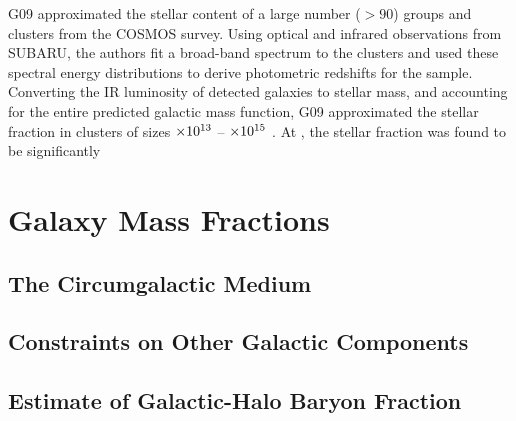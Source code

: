 G09 approximated the stellar content of a large number ($>90$) groups
and clusters from the COSMOS survey. Using optical and infrared
observations from SUBARU, the authors fit a broad-band spectrum to the
clusters and used these spectral energy distributions to derive photometric redshifts for
the sample. Converting the IR luminosity of detected galaxies to
stellar mass, and accounting for the entire predicted galactic mass
function, G09 approximated the stellar fraction in clusters of sizes
$\times 10^{13}$ -- $\times 10^{15}$ \Msun. At \rfive{}, the stellar fraction
was found to be significantly 

\section{Galaxy Mass Fractions}
\label{sec:Galaxy}

\subsection{The Circumgalactic Medium}
\label{sec:Galaxy.CGM}

\subsection{Constraints on Other Galactic Components}
\label{sec:Galaxy.Components}

\subsection{Estimate of Galactic-Halo Baryon Fraction}
\label{sec:Galaxy.Fraction}
